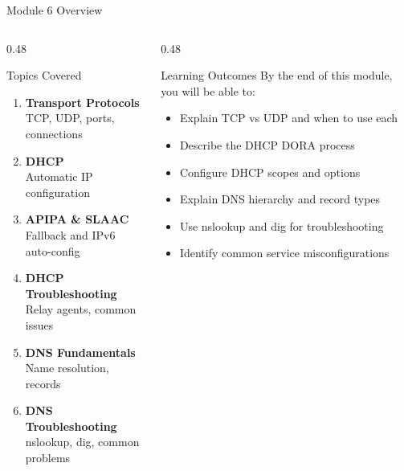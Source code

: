 \documentclass[aspectratio=169, 11pt]{beamer}
\begin{document}
\begin{frame}{Module 6 Overview}
    \begin{columns}[T]
        \begin{column}{0.48\textwidth}
            \begin{block}{Topics Covered}
                \small
                \begin{enumerate}\setlength{\itemsep}{3pt}
                    \item \textbf{Transport Protocols} \\
                          {\scriptsize TCP, UDP, ports, connections}
                    \item \textbf{DHCP} \\
                          {\scriptsize Automatic IP configuration}
                    \item \textbf{APIPA \& SLAAC} \\
                          {\scriptsize Fallback and IPv6 auto-config}
                    \item \textbf{DHCP Troubleshooting} \\
                          {\scriptsize Relay agents, common issues}
                    \item \textbf{DNS Fundamentals} \\
                          {\scriptsize Name resolution, records}
                    \item \textbf{DNS Troubleshooting} \\
                          {\scriptsize nslookup, dig, common problems}
                \end{enumerate}
            \end{block}
        \end{column}
        \begin{column}{0.48\textwidth}
            \begin{block}{Learning Outcomes}
                \small
                By the end of this module, you will be able to:
                \begin{itemize}\setlength{\itemsep}{2pt}
                    \item Explain TCP vs UDP and when to use each
                    \item Describe the DHCP DORA process
                    \item Configure DHCP scopes and options
                    \item Explain DNS hierarchy and record types
                    \item Use nslookup and dig for troubleshooting
                    \item Identify common service misconfigurations
                \end{itemize}
            \end{block}
            

\end{column}
\end{columns}
\end{frame}
\end{document}

